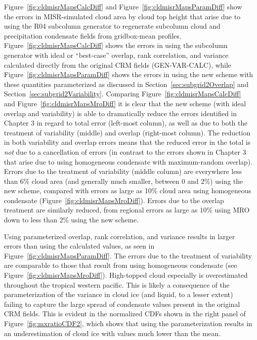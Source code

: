 Figure~\ref{fig:cldmisrMapsCalcDiff} and
Figure~\ref{fig:cldmisrMapsParamDiff} show the errors in MISR-simulated
cloud area by cloud top height that arise due to using the R04 subcolumn
generator to regenerate subcolumn cloud and precipitation condensate
fields from gridbox-mean profiles. Figure~\ref{fig:cldmisrMapsCalcDiff}
shows the errors in using the subcolumn generator with ideal or
``best-case'' overlap, rank correlation, and variance calculated
directly from the original CRM fields (GEN-VAR-CALC), while
Figure~\ref{fig:cldmisrMapsParamDiff} shows the errors in using the new
scheme with these quantities parameterized as discussed in
Section~\ref{sec:subgrid2Overlap} and
Section~\ref{sec:subgrid2Variability}. Comparing
Figure~\ref{fig:cldmisrMapsCalcDiff} and
Figure~\ref{fig:cldmisrMapsMroDiff} it is clear that the new scheme
(with ideal overlap and variability) is able to dramatically reduce the
errors identified in Chapter 3 in regard to total error (left-most
column), as well as due to both the treatment of variability (middle)
and overlap (right-most column). The reduction in both variability and
overlap errors means that the reduced error in the total is \emph{not}
due to a cancellation of errors (in contrast to the errors shown in
Chapter 3 that arise due to using homogeneous condensate with
maximum-random overlap). Errors due to the treatment of variability
(middle column) are everywhere less than 6\% cloud area (and generally
much smaller, between 0 and 2\%) using the new scheme, compared with
errors as large as 10\% cloud area using homogeneous condensate
(Figure~\ref{fig:cldmisrMapsMroDiff}). Errors due to the overlap
treatment are similarly reduced, from regional errors as large as 10\%
using MRO down to less than 2\% using the new scheme.

Using parameterized overlap, rank correlation, and variance results in
larger errors than using the calculated values, as seen in
Figure~\ref{fig:cldmisrMapsParamDiff}. The errors due to the treatment
of variability are comparable to those that result from using
homogeneous condensate (see Figure~\ref{fig:cldmisrMapsMroDiff}).
High-topped cloud especially is overestimated throughout the tropical
western pacific. This is likely a consequence of the parameterization of
the variance in cloud ice (and liquid, to a lesser extent) failing to
capture the large spread of condensate values present in the original
CRM fields. This is evident in the normalized CDFs shown in the right
panel of Figure~\ref{fig:mxratioCDF2}, which shows that using the
parameterization results in an underestimation of cloud ice with values
much lower than the mean.

